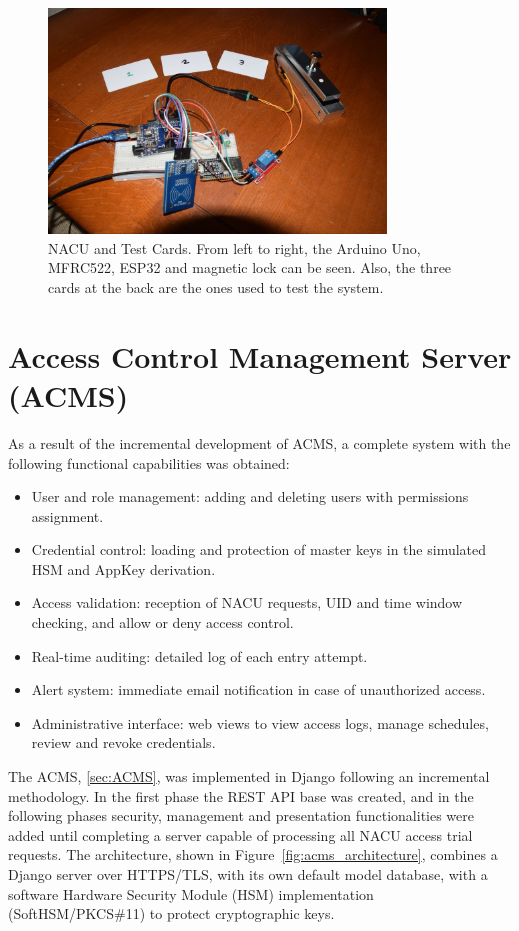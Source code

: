 \begin{figure}[h]
	\centering
	\includegraphics[width=0.8\textwidth]{imaxes/NACU} %
	\caption{NACU and Test Cards. From left to right, the Arduino Uno, MFRC522, ESP32 and magnetic lock can be seen. Also, the three cards at the back are the ones used to test the system.}
	\label{fig:nacu_hardware}
\end{figure}

\section{Access Control Management Server (ACMS)}
\label{sec:acms}

As a result of the incremental development of ACMS, a complete system with the following functional capabilities was obtained:
\begin{itemize}
	\item User and role management: adding and deleting users with permissions assignment.
	\item Credential control: loading and protection of master keys in the simulated HSM and AppKey derivation.
	\item Access validation: reception of NACU requests, UID and time window checking, and allow or deny access control.
	\item Real-time auditing: detailed log of each entry attempt.
	\item Alert system: immediate email notification in case of unauthorized access.
	\item Administrative interface: web views to view access logs, manage schedules, review and revoke credentials.
\end{itemize}

The ACMS, \ref{sec:ACMS}, was implemented in Django following an incremental methodology. In the first phase the REST API base was created, and in the following phases security, management and presentation functionalities were added until completing a server capable of processing all NACU access trial requests. The architecture, shown in Figure~\ref{fig:acms_architecture}, combines a Django server over HTTPS/TLS, with its own default model database, with a software Hardware Security Module (HSM) implementation (SoftHSM/PKCS\#11) to protect cryptographic keys.

